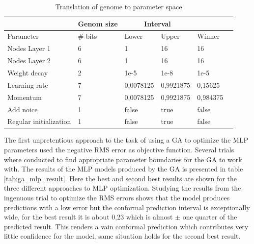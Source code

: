 \begin{table}[H]
\begin{tabular}{ | l | l | l | l | l | l | }
\hline
\multicolumn{1}{|c|}{} & \multicolumn{1}{|c|}{Genom size} & \multicolumn{2}{|c|}{Interval} & \multicolumn{1}{|c|}{} \\
\hline
Parameter & \# bits & Lower & Upper & Winner\\
\hline
Nodes Layer 1 & 6 & 1 & 16 & 16 \\
Nodes Layer 2 & 6 & 1 & 16 & 16 \\
Weight decay & 2 & 1e-5 & 1e-8 & 1e-5 \\
Learning rate & 7 & 0,0078125 & 0,9921875 & 0,15625 \\
Momentum & 7 & 0,0078125 & 0,9921875 & 0,984375 \\
Add noice & 1 & false & true & false \\ 
Regular initialization & 1 & false & true & false \\
\hline
\end{tabular}
\caption{Translation of genome to parameter space}
\label{tab:ga_mlp_genom}
\end{table}

The first unpretentious approach to the task of using a GA to optimize the MLP parameters used the negative RMS error as objective function. Several trials where conducted to find appropriate parameter boundaries for the GA to work with. The results of the MLP models produced by the GA is presented in table \ref{tab:ga_mlp_result}. Here the best and second best results are shown for the three different approaches to MLP optimization. Studying the results from the ingenuous trial to optimize the RMS errors shows that the model produces predictions with a low error but the conformal prediction interval is exceptionally wide, for the best result it is about 0,23 which is almost $\pm$ one quarter of the predicted result. This renders a vain conformal prediction which contributes very little confidence for the model, same situation holds for the second best result.
\\

